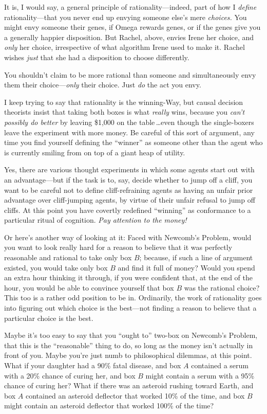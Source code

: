  It is, I would say, a general principle of rationality---indeed,
part of how I \textit{define} rationality---that you never end up
envying someone else's mere \textit{choices.} You might
envy someone their genes, if Omega rewards genes, or if the genes give
you a generally happier disposition. But Rachel, above, envies Irene
her choice, and \textit{only} her choice, irrespective of what
algorithm Irene used to make it. Rachel wishes \textit{just} that she
had a disposition to choose differently.


 You shouldn't claim to be more rational than
someone and simultaneously envy them their choice---\textit{only} their
choice. Just \textit{do} the act you envy.


 I keep trying to say that rationality is the winning-Way, but
causal decision theorists insist that taking both boxes is what
\textit{really} wins, because you \textit{can't
possibly do better} by leaving \$1,000 on the table\,\ldots even though
the single-boxers leave the experiment with more money. Be careful of
this sort of argument, any time you find yourself defining the
``winner'' as someone other than the
agent who is currently smiling from on top of a giant heap of utility.


 Yes, there are various thought experiments in which some agents
start out with an advantage---but if the task is to, say, decide
whether to jump off a cliff, you want to be careful not to define
cliff-refraining agents as having an unfair prior advantage over
cliff-jumping agents, by virtue of their unfair refusal to jump off
cliffs. At this point you have covertly redefined
``winning'' as conformance to a
particular ritual of cognition. \textit{Pay attention to the money!}


 Or here's another way of looking at it: Faced with
Newcomb's Problem, would you want to look really hard
for a reason to believe that it was perfectly reasonable and rational
to take only box $B$; because, if such a line of argument existed, you
would take only box $B$ and find it full of money? Would you spend an
extra hour thinking it through, if you were confident that, at the end
of the hour, you would be able to convince yourself that box $B$ was the
rational choice? This too is a rather odd position to be in.
Ordinarily, the work of rationality goes into figuring out which choice
is the best---not finding a reason to believe that a particular choice
is the best.


 Maybe it's too easy to say that you
``ought to'' two-box on
Newcomb's Problem, that this is the
``reasonable'' thing to do, so long
as the money isn't actually in front of you. Maybe
you're just numb to philosophical dilemmas, at this
point. What if your daughter had a 90\% fatal disease, and box $A$
contained a serum with a 20\% chance of curing her, and box $B$ might
contain a serum with a 95\% chance of curing her? What if there was an
asteroid rushing toward Earth, and box $A$ contained an asteroid
deflector that worked 10\% of the time, and box $B$ might contain an
asteroid deflector that worked 100\% of the time?

